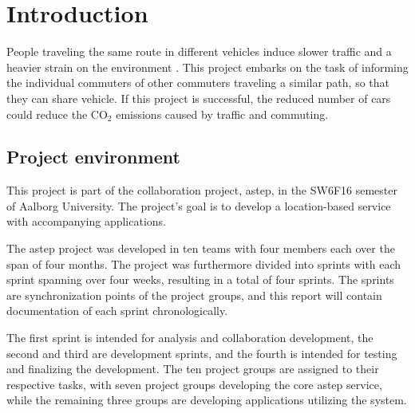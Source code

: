 \chapter{Introduction}\label{ch:introduction}


People traveling the same route in different vehicles induce slower traffic and a heavier strain on the environment \cite{trafficJam}\cite{trafficEmissions}.
This project embarks on the task of informing the individual commuters of other commuters traveling a similar path, so that they can share vehicle.
If this project is successful, the reduced number of cars could reduce the CO$_2$ emissions caused by traffic and commuting.

\section{Project environment}
This project is part of the collaboration project, \gls{astep}, in the SW6F16 semester of Aalborg University.
The project's goal is to develop a location-based service with accompanying applications. 

The \gls{astep} project was developed in ten teams with four members each over the span of four months.
The project was furthermore divided into sprints with each sprint spanning over four weeks, resulting in a total of four sprints.
The sprints are synchronization points of the project groups, and this report will contain documentation of each sprint chronologically.

The first sprint is intended for analysis and collaboration development, the second and third are development sprints, and the fourth is intended for testing and finalizing the development.
The ten project groups are assigned to their respective tasks, with seven project groups developing the core \gls{astep} service, while the remaining three groups are developing applications utilizing the system.



